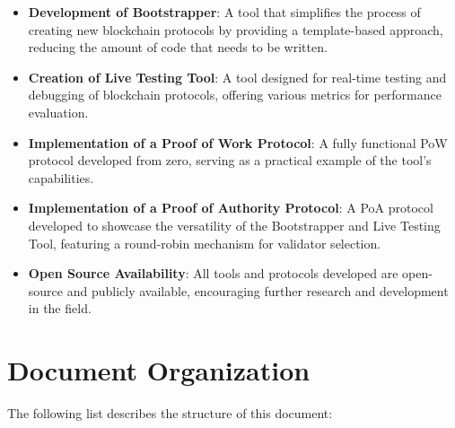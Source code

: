 \begin{itemize}
\item\textbf{Development of Bootstrapper}: A tool that simplifies the process of creating new blockchain protocols by providing a template-based approach, reducing the amount of code that needs to be written.

\item\textbf{Creation of Live Testing Tool}: A tool designed for real-time testing and debugging of blockchain protocols, offering various metrics for performance evaluation.

\item\textbf{Implementation of a Proof of Work Protocol}: A fully functional PoW protocol developed from zero, serving as a practical example of the tool's capabilities.

\item\textbf{Implementation of a Proof of Authority Protocol}: A PoA protocol developed to showcase the versatility of the Bootstrapper and Live Testing Tool, featuring a round-robin mechanism for validator selection.

\item\textbf{Open Source Availability}: All tools and protocols developed are open-source and publicly available, encouraging further research and development in the field.

\end{itemize}


\section{Document Organization}
The following list describes the structure of this document:

